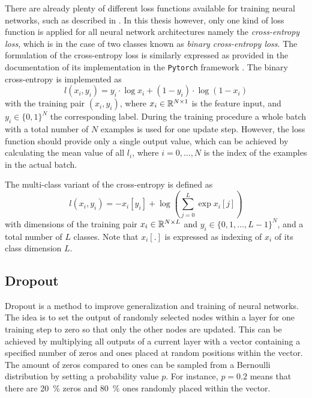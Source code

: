 There are already plenty of different loss functions available for training neural networks, such as described in \cite{LeCun2006}. 
In this thesis however, only one kind of loss function is applied for all neural network architectures namely the \emph{cross-entropy loss}, which is in the case of two classes known as \emph{binary cross-entropy loss}.
The formulation of the cross-entropy loss is similarly expressed as provided in the documentation of its implementation in the \texttt{Pytorch} framework \cite{Pytorch}.
The binary cross-entropy is implemented as
\begin{equation}\label{eq:nn_theory_binary_cross_entropy}
  l(x_i, y_i) = y_i \cdot \log x_i + (1 - y_i) \cdot \log (1 - x_i)
\end{equation}
with the training pair $(x_i, y_i)$, where $x_i \in \mathbb{R}^{N \times 1}$ is the feature input, and $y_i \in \{0, 1\}^N$ the corresponding label.
During the training procedure a whole batch with a total number of $N$ examples is used for one update step.
However, the loss function should provide only a single output value, which can be achieved by calculating the mean value of all $l_i$, where $i = 0, \dots, N$ is the index of the examples in the actual batch.

The multi-class variant of the cross-entropy is defined as
\begin{equation}
  l(x_i, y_i) = - x_i[y_i] + \log{\left( \sum_{j=0}^{L} \exp{x_i[j]} \right)}
\end{equation}
with dimensions of the training pair $x_i \in \mathbb{R}^{N \times L}$ and $y_i \in \{0, 1, \dots, L - 1\}^N$, and a total number of $L$ classes.
Note that $x_i[.]$ is expressed as indexing of $x_i$ of its class dimension $L$. 



\subsection{Dropout}
Dropout \cite{Hinton2012} is a method to improve generalization and training of neural networks.
The idea is to set the output of randomly selected nodes within a layer for one training step to zero so that only the other nodes are updated.
This can be achieved by multiplying all outputs of a current layer with a vector containing a specified number of zeros and ones placed at random positions within the vector.
The amount of zeros compared to ones can be sampled from a Bernoulli distribution by setting a probability value $p$.
For instance, $p=0.2$ means that there are \SI{20}{\percent} zeros and \SI{80}{\percent} ones randomly placed within the vector.



